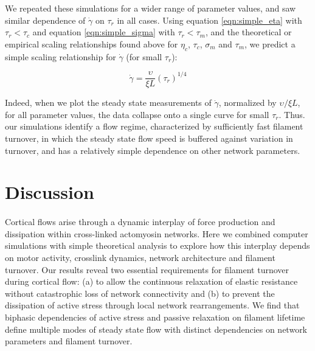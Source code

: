 \documentclass[10pt,letterpaper]{article}
\begin{document}
We repeated these simulations for a wider range of parameter values, and saw similar dependence of $\dot{\gamma}$ on $\tau_r$ in all cases.  Using equation \ref{eqn:simple_eta} with $\tau_r < \tau_c$ and equation \ref{eqn:simple_sigma} with $\tau_r < \tau_m$, and the theoretical or empirical scaling relationships found above for $\eta_c$, $\tau_c$, $\sigma_m$ and $\tau_m$, we predict a simple scaling relationship for $\dot{\gamma}$ (for small $\tau_r$):


\begin{equation}
\label{eqn:flow_scaling_eq}
\dot{\gamma} = \frac{\upsilon}{\xi L}  \left ( \tau_r \right ) ^{1/4}
\end{equation}

Indeed, when we plot the steady state measurements of $\dot{\gamma}$, normalized by $\upsilon/\xi L$,  for all parameter values, the data collapse onto a single curve for small $\tau_r$.  Thus. our simulations identify a flow regime, characterized by sufficiently fast filament turnover, in which the steady state flow speed is buffered against variation in turnover, and has a relatively simple dependence on other network parameters.



\section*{Discussion}

\paragraph{} Cortical flows arise through a dynamic interplay of force production and dissipation within cross-linked actomyosin networks. Here we combined computer simulations with simple theoretical analysis to explore how this interplay depends on motor activity, crosslink dynamics, network architecture and filament turnover. Our results reveal two essential requirements for filament turnover during cortical flow:  (a) to allow the continuous relaxation of elastic resistance without catastrophic loss of network connectivity and (b) to prevent the dissipation of active stress through local network rearrangements. We find that biphasic dependencies of active stress and passive relaxation on filament lifetime define multiple modes of steady state flow with distinct dependencies on network parameters and filament turnover.
\end{document}
